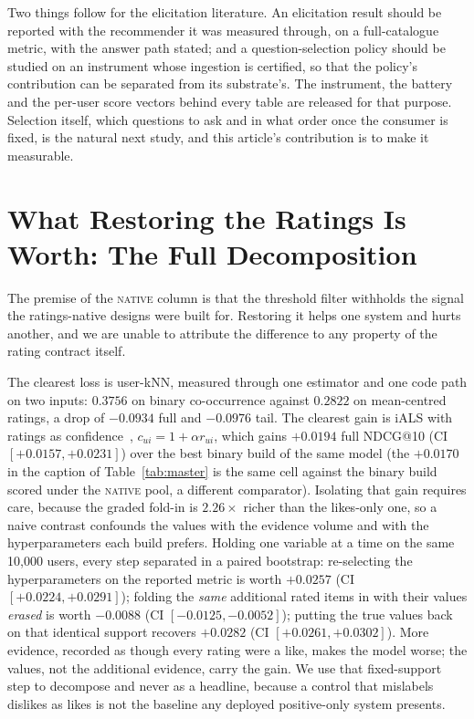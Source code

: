 \documentclass[manuscript,screen]{acmart}
\begin{document}
Two things follow for the elicitation literature. An elicitation result should be reported with the recommender it was measured through, on a full-catalogue metric, with the answer path stated; and a question-selection policy should be studied on an instrument whose ingestion is certified, so that the policy's contribution can be separated from its substrate's. The instrument, the battery and the per-user score vectors behind every table are released for that purpose. Selection itself, which questions to ask and in what order once the consumer is fixed, is the natural next study, and this article's contribution is to make it measurable.

\begin{acks}
\end{acks}




\appendix
\section{What Restoring the Ratings Is Worth: The Full Decomposition}\label{app:ratings}
The premise of the \textsc{native} column is that the threshold filter withholds the signal the ratings-native designs were built for. Restoring it helps one system and hurts another, and we are unable to attribute the difference to any property of the rating contract itself.

The clearest loss is user-kNN, measured through one estimator and one code path on two inputs: $0.3756$ on binary co-occurrence against $0.2822$ on mean-centred ratings, a drop of $-0.0934$ full and $-0.0976$ tail. The clearest gain is iALS with ratings as confidence~\citep{hu2008collaborative}, $c_{ui}=1+\alpha r_{ui}$, which gains $+0.0194$ full NDCG@10 (CI $[+0.0157,+0.0231]$) over the best binary build of the same model (the $+0.0170$ in the caption of Table~\ref{tab:master} is the same cell against the binary build scored under the \textsc{native} pool, a different comparator). Isolating that gain requires care, because the graded fold-in is $2.26\times$ richer than the likes-only one, so a naive contrast confounds the values with the evidence volume and with the hyperparameters each build prefers. Holding one variable at a time on the same 10,000 users, every step separated in a paired bootstrap: re-selecting the hyperparameters on the reported metric is worth $+0.0257$ (CI $[+0.0224,+0.0291]$); folding the \emph{same} additional rated items in with their values \emph{erased} is worth $-0.0088$ (CI $[-0.0125,-0.0052]$); putting the true values back on that identical support recovers $+0.0282$ (CI $[+0.0261,+0.0302]$). More evidence, recorded as though every rating were a like, makes the model worse; the values, not the additional evidence, carry the gain. We use that fixed-support step to decompose and never as a headline, because a control that mislabels dislikes as likes is not the baseline any deployed positive-only system presents.
\end{document}
